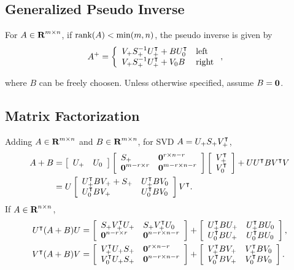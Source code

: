 \documentclass{article}
\begin{document}

\subsection{Generalized Pseudo Inverse}

    For $A\in\textbf{R}^{m\times n}$, if $\text{rank}(A)<\min(m,n)$, 
    the pseudo inverse is given by
    \begin{align*}
        A^+&=\left\{\begin{array}{lllllllllllllllllll}
            V_+ S_+^{-1} U_+^\intercal+BU_0^\intercal & \text{left}\\
            V_+ S_+^{-1} U_+^\intercal+V_0 B & \text{right}
        \end{array}\right.,
    \end{align*}

    where $B$ can be freely choosen.  Unless otherwise specified, assume $B=\textbf{0}$.


\subsection{Matrix Factorization}

    Adding $A\in\textbf{R}^{m\times n}$ and $B\in\textbf{R}^{m\times n}$, for SVD $A=U_+S_+V_+^\intercal$,
    \begin{align*}
        A+B &= \left[\begin{array}{lllllllllllllllllll}
                U_+ & U_0
                \end{array}\right]
            \left[\begin{array}{lllllllllllllllllll}
                    S_+ & \textbf{0}^{r\times n-r}\\
                    \textbf{0}^{m-r\times r} & \textbf{0}^{m-r\times n-r}
            \end{array}\right]
            \left[\begin{array}{lllllllllllllllllll}
                V_+^\intercal \\
                V_0^\intercal
            \end{array}\right]
            + UU^\intercal B V^\intercal V\\
            &= U
            \left[\begin{array}{lllllllllllllllllll}
                    U_+^\intercal B V_++S_+
                &
                U_+^\intercal B V_0
                \\
                U_0^\intercal B V_+ 
                &
                U_0^\intercal B V_0
            \end{array}\right]
            V^\intercal.
    \end{align*}
    If $A\in\textbf{R}^{n\times n}$,
    \begin{align*}
        U^\intercal (A+B) U 
            &=\left[\begin{array}{lllllllllllllllllll}
                S_+ V_+^\intercal U_+ & S_+ V_+^\intercal U_0\\
                \textbf{0}^{n-r\times r} & \textbf{0}^{n-r\times n-r}
            \end{array}\right]+        \left[\begin{array}{lllllllllllllllllll}
                U_+^\intercal B U_+
            &
            U_+^\intercal B U_0
            \\
            U_0^\intercal B U_+ 
            &
            U_0^\intercal B U_0
        \end{array}\right],\\
        V^\intercal (A+B) V 
            &=\left[\begin{array}{lllllllllllllllllll}
                V_+^\intercal U_+S_+ & \textbf{0}^{r\times n-r}\\
                V_0^\intercal U_+ S_+ & \textbf{0}^{n-r\times n-r}
            \end{array}\right]+        \left[\begin{array}{lllllllllllllllllll}
                V_+^\intercal B V_+
            &
            V_+^\intercal B V_0
            \\
            V_0^\intercal B V_+ 
            &
            V_0^\intercal B V_0
        \end{array}\right].
    \end{align*}
\end{document}
